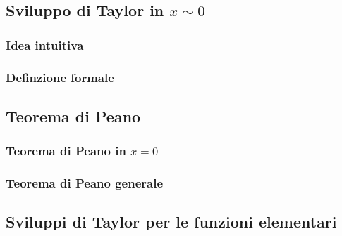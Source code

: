 \subsection{Sviluppo di Taylor in $x \sim 0$}

\subsubsection{Idea intuitiva}

\subsubsection{Definzione formale}


\subsection{Teorema di Peano}
\subsubsection{Teorema di Peano in $x = 0$}
\subsubsection{Teorema di Peano generale}


\subsection{Sviluppi di Taylor per le funzioni elementari}
